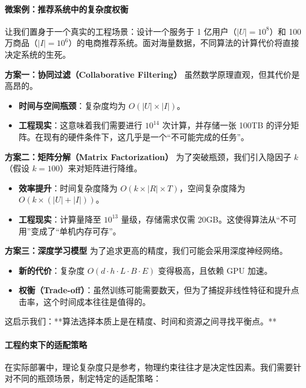 \paragraph{微案例：推荐系统中的复杂度权衡}

让我们置身于一个真实的工程场景：设计一个服务于 1 亿用户（$|U|=10^8$）和 100 万商品（$|I|=10^6$）的电商推荐系统。面对海量数据，不同算法的计算代价将直接决定系统的生死。

\textbf{方案一：协同过滤（Collaborative Filtering）}
虽然数学原理直观，但其代价是高昂的。
\begin{itemize}
    \item \textbf{时间与空间瓶颈}：复杂度均为 $O(|U| \times |I|)$。
    \item \textbf{工程现实}：这意味着我们需要进行 $10^{14}$ 次计算，并存储一张 100TB 的评分矩阵。在现有的硬件条件下，这几乎是一个“不可能完成的任务”。
\end{itemize}

\textbf{方案二：矩阵分解（Matrix Factorization）}
为了突破瓶颈，我们引入隐因子 $k$（假设 $k=100$）来对矩阵进行降维。
\begin{itemize}
    \item \textbf{效率提升}：时间复杂度降为 $O(k \times |R| \times T)$，空间复杂度降为 $O(k \times (|U| + |I|))$。
    \item \textbf{工程现实}：计算量降至 $10^{13}$ 量级，存储需求仅需 20GB。这使得算法从“不可用”变成了“单机内存可存”。
\end{itemize}

\textbf{方案三：深度学习模型}
为了追求更高的精度，我们可能会采用深度神经网络。
\begin{itemize}
    \item \textbf{新的代价}：复杂度 $O(d \cdot h \cdot L \cdot B \cdot E)$ 变得极高，且依赖 GPU 加速。
    \item \textbf{权衡（Trade-off）}：虽然训练可能需要数天，但为了捕捉非线性特征和提升点击率，这个时间成本往往是值得的。
\end{itemize}

这启示我们：**算法选择本质上是在精度、时间和资源之间寻找平衡点。**

\paragraph{工程约束下的适配策略}

在实际部署中，理论复杂度只是参考，物理约束往往才是决定性因素。我们需要针对不同的瓶颈场景，制定特定的适配策略：

